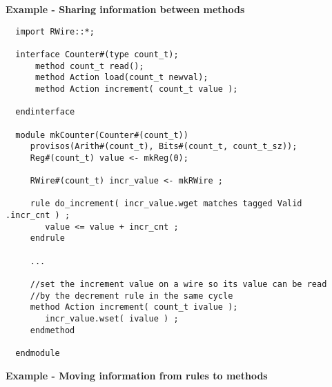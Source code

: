 {\bf Example - Sharing information between methods}
\begin{verbatim}
  import RWire::*;

  interface Counter#(type count_t);
      method count_t read();
      method Action load(count_t newval);
      method Action increment( count_t value );

  endinterface

  module mkCounter(Counter#(count_t))
     provisos(Arith#(count_t), Bits#(count_t, count_t_sz));
     Reg#(count_t) value <- mkReg(0);

     RWire#(count_t) incr_value <- mkRWire ;
   
     rule do_increment( incr_value.wget matches tagged Valid  .incr_cnt ) ;
        value <= value + incr_cnt ;
     endrule
   
     ...
   
     //set the increment value on a wire so its value can be read
     //by the decrement rule in the same cycle
     method Action increment( count_t ivalue );
        incr_value.wset( ivalue ) ;
     endmethod
      
  endmodule
\end{verbatim}
{\bf Example - Moving information from rules to methods}
